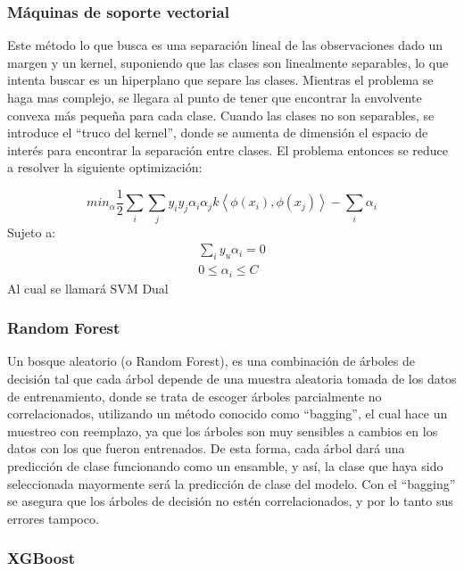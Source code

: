 \documentclass[runningheads]{llncs}
\begin{document}
\subsubsection{Máquinas de soporte vectorial}
Este método lo que busca es una separación lineal de las observaciones dado un margen y un kernel, suponiendo que las clases son linealmente separables, lo que intenta buscar es un hiperplano que separe las clases. Mientras el problema se haga mas complejo, se llegara al punto de tener que encontrar la envolvente convexa más pequeña para cada clase. Cuando las clases no son separables, se introduce el ``truco del kernel'', donde se aumenta de dimensión el espacio de interés para encontrar la separación entre clases. El problema entonces se reduce a resolver la siguiente optimización:

\begin{equation}
    min_{\alpha}\frac{1}{2}\sum_i \sum_j y_iy_j\alpha_i\alpha_jk\left \langle \phi(x_i) , \phi(x_j)\right \rangle - \sum_i\alpha_i
\end{equation}
Sujeto a:
\begin{align*}
    \sum_i y_u\alpha_i=0 \\
    0\leq \alpha_i \leq C
\end{align*}
Al cual se llamará SVM Dual\cite{deisenroth2020mathematics}

\subsubsection{Random Forest}

Un bosque aleatorio (o Random Forest)\cite{breiman2001random}, es una combinación de árboles de decisión tal que cada árbol depende de una muestra aleatoria tomada de los datos de entrenamiento, donde se trata de escoger árboles parcialmente no correlacionados, utilizando un método conocido como ``bagging'', el cual hace un muestreo con reemplazo, ya que los árboles son muy sensibles a cambios en los datos con los que fueron entrenados. De esta forma, cada árbol dará una predicción de clase funcionando como un ensamble, y así, la clase que haya sido seleccionada mayormente será la predicción de clase del modelo. Con el ``bagging'' se asegura que los árboles de decisión no estén correlacionados, y por lo tanto sus errores tampoco. \cite{randomForest}

\subsubsection{XGBoost}
\end{document}
